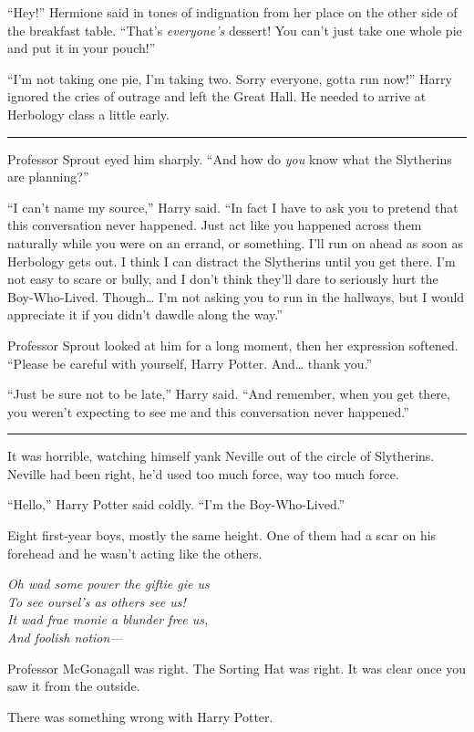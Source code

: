 ``Hey!'' Hermione said in tones of indignation from her place on the
other side of the breakfast table. ``That's \emph{everyone's} dessert!
You can't just take one whole pie and put it in your pouch!''

``I'm not taking one pie, I'm taking two. Sorry everyone, gotta run
now!'' Harry ignored the cries of outrage and left the Great Hall. He
needed to arrive at Herbology class a little early.

\begin{center}\rule{3in}{0.4pt}\end{center}

Professor Sprout eyed him sharply. ``And how do \emph{you} know what the
Slytherins are planning?''

``I can't name my source,'' Harry said. ``In fact I have to ask you to
pretend that this conversation never happened. Just act like you
happened across them naturally while you were on an errand, or
something. I'll run on ahead as soon as Herbology gets out. I think I
can distract the Slytherins until you get there. I'm not easy to scare
or bully, and I don't think they'll dare to seriously hurt the
Boy-Who-Lived. Though\ldots{} I'm not asking you to run in the hallways,
but I would appreciate it if you didn't dawdle along the way.''

Professor Sprout looked at him for a long moment, then her expression
softened. ``Please be careful with yourself, Harry Potter. And\ldots{}
thank you.''

``Just be sure not to be late,'' Harry said. ``And remember, when you
get there, you weren't expecting to see me and this conversation never
happened.''

\begin{center}\rule{3in}{0.4pt}\end{center}

It was horrible, watching himself yank Neville out of the circle of
Slytherins. Neville had been right, he'd used too much force, way too
much force.

``Hello,'' Harry Potter said coldly. ``I'm the Boy-Who-Lived.''

Eight first-year boys, mostly the same height. One of them had a scar on
his forehead and he wasn't acting like the others.

\emph{Oh wad some power the giftie gie us}\\\emph{To see oursel's as
others see us!}\\\emph{It wad frae monie a blunder free us,}\\\emph{And
foolish notion---}

Professor McGonagall was right. The Sorting Hat was right. It was clear
once you saw it from the outside.

There was something wrong with Harry Potter.
